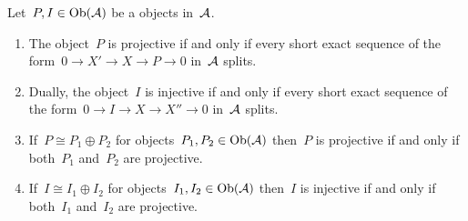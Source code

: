\begin{lemma}
  \label{more on projectives and injectives}
  Let~$P, I \in \operatorname{Ob}(\mathcal{A})$ be a objects in~$\mathcal{A}$.
  \begin{enumerate}
    \item
      \label{ses ending in projective}
      The object~$P$ is projective if and only if every short exact sequence of the form~$0 \to X' \to X \to P \to 0$ in~$\mathcal{A}$ splits.
    \item
      Dually, the object~$I$ is injective if and only if every short exact sequence of the form~$0 \to I \to X \to X'' \to 0$ in~$\mathcal{A}$ splits.
    \item
      \label{direct summand of projective}
      If~$P \cong P_1 \oplus P_2$ for objects~$P_1, P_2 \in \operatorname{Ob}(\mathcal{A})$ then~$P$ is projective if and only if both~$P_1$ and~$P_2$ are projective.
    \item
      \label{direct summand of injective}
      If~$I \cong I_1 \oplus I_2$ for objects~$I_1, I_2 \in \operatorname{Ob}(\mathcal{A})$ then~$I$ is injective if and only if both~$I_1$ and~$I_2$ are projective.
  \end{enumerate}
\end{lemma}


